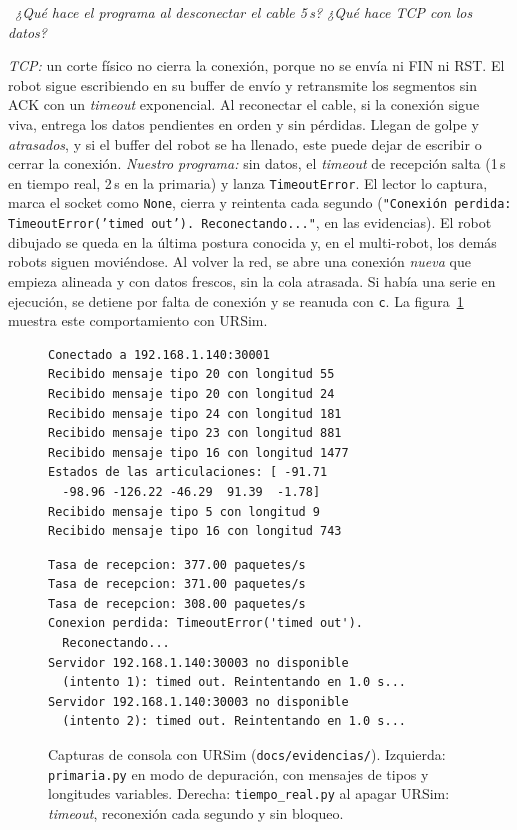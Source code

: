 \documentclass[10pt,a4paper]{article}
\newcommand{\code}[1]{\texttt{\small #1}}
\newcommand{\preg}[2]{\par\smallskip\noindent{\color{azul}\bfseries P#1.}~{\itshape #2}\par\nopagebreak}
\begin{document}
\preg{6}{¿Qué hace el programa al desconectar el cable 5\,s? ¿Qué hace TCP con los datos?}
\emph{TCP:} un corte físico no cierra la conexión, porque no se envía ni FIN ni RST. El robot sigue escribiendo en su buffer de envío y retransmite los segmentos sin ACK con un \emph{timeout} exponencial. Al reconectar el cable, si la conexión sigue viva, entrega los datos pendientes en orden y sin pérdidas. Llegan de golpe y \emph{atrasados}, y si el buffer del robot se ha llenado, este puede dejar de escribir o cerrar la conexión. \emph{Nuestro programa:} sin datos, el \emph{timeout} de recepción salta (1\,s en tiempo real, 2\,s en la primaria) y lanza \code{TimeoutError}. El lector lo captura, marca el socket como \code{None}, cierra y reintenta cada segundo (\code{"Conexión perdida: TimeoutError('timed out'). Reconectando..."}, en las evidencias). El robot dibujado se queda en la última postura conocida y, en el multi-robot, los demás robots siguen moviéndose. Al volver la red, se abre una conexión \emph{nueva} que empieza alineada y con datos frescos, sin la cola atrasada. Si había una serie en ejecución, se detiene por falta de conexión y se reanuda con \code{c}. La figura~\ref{fig:evid} muestra este comportamiento con URSim.

\begin{figure}[h]
\centering
\begin{minipage}[t]{0.47\linewidth}
\begin{lstlisting}[numbers=none,language={},basicstyle=\ttfamily\scriptsize,backgroundcolor=\color{gris}]
Conectado a 192.168.1.140:30001
Recibido mensaje tipo 20 con longitud 55
Recibido mensaje tipo 20 con longitud 24
Recibido mensaje tipo 24 con longitud 181
Recibido mensaje tipo 23 con longitud 881
Recibido mensaje tipo 16 con longitud 1477
Estados de las articulaciones: [ -91.71
  -98.96 -126.22 -46.29  91.39  -1.78]
Recibido mensaje tipo 5 con longitud 9
Recibido mensaje tipo 16 con longitud 743
\end{lstlisting}
\end{minipage}\hfill
\begin{minipage}[t]{0.51\linewidth}
\begin{lstlisting}[numbers=none,language={},basicstyle=\ttfamily\scriptsize,backgroundcolor=\color{gris}]
Tasa de recepcion: 377.00 paquetes/s
Tasa de recepcion: 371.00 paquetes/s
Tasa de recepcion: 308.00 paquetes/s
Conexion perdida: TimeoutError('timed out').
  Reconectando...
Servidor 192.168.1.140:30003 no disponible
  (intento 1): timed out. Reintentando en 1.0 s...
Servidor 192.168.1.140:30003 no disponible
  (intento 2): timed out. Reintentando en 1.0 s...
\end{lstlisting}
\end{minipage}
\caption{Capturas de consola con URSim (\code{docs/evidencias/}). Izquierda: \code{primaria.py} en modo de depuración, con mensajes de tipos y longitudes variables. Derecha: \code{tiempo\_real.py} al apagar URSim: \emph{timeout}, reconexión cada segundo y sin bloqueo.}\label{fig:evid}
\end{figure}
\end{document}
